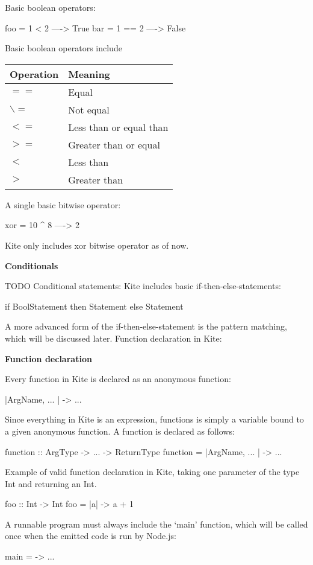 Basic boolean operators:
\begin{kite}
  
  foo = 1 < 2  ----> True
  bar = 1 == 2 ----> False
\end{kite}
Basic boolean operators include 
\begin{table}[H]
\centering
    \begin{tabular}{|l|l|}
    \hline
    Operation & Meaning                 \\ \hline
    $==$        & Equal                   \\ \hline
    $\backslash=$        & Not equal               \\ \hline
    $<=$        & Less than or equal than \\ \hline
    $>=$        & Greater than or equal   \\ \hline
    $<$         & Less than               \\ \hline
    $>$         & Greater than            \\ \hline
    \end{tabular}
\end{table}

A single basic bitwise operator:
\begin{kite}
  
  xor = 10 ^ 8 ----> 2
\end{kite}
Kite only includes xor bitwise operator as of now.

\textbf{Conditionals}


TODO Conditional statements:
Kite includes basic if-then-else-statements:
\begin{kite}
  
  if BoolStatement then Statement else Statement
\end{kite}
A more advanced form of the if-then-else-statement is the pattern
matching, which will be discussed later.
Function declaration in Kite:

\textbf{Function declaration}

Every function in Kite is declared as an anonymous function:
\begin{kite}
  
|ArgName, ... | -> { ... }
\end{kite}

Since everything in Kite is an expression, functions is simply a
variable bound to a given anonymous function. A function is declared
as follows:
\begin{kite}
  
  function :: ArgType -> ... -> ReturnType
  function = |ArgName, ... | -> { ... }
\end{kite}
Example of valid function declaration in Kite, taking one parameter of
the type Int and returning an Int.
\begin{kite}
  
  foo :: Int -> Int
  foo = |a| -> {
    a + 1
  }
\end{kite}
A runnable program must always include the `main' function, which will be called once when the emitted code is run by Node.js:
\begin{kite}
  
  main = -> { ... }
\end{kite}

